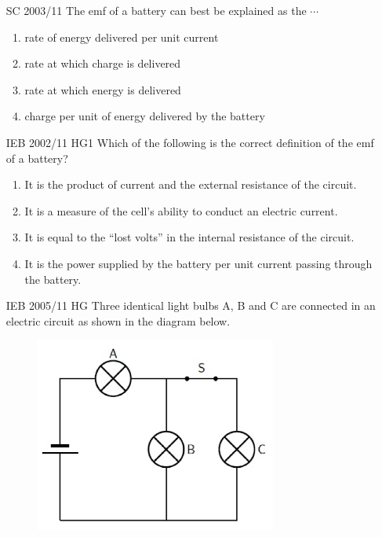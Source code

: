 \begin{enumerate}[noitemsep, label=\textbf{\arabic*}. ]
\label{m38776*uid90}\item [SC 2003/11] The emf of a battery can best be explained as the \begin{math}\cdots \end{math}\label{m38776*id68404}\begin{enumerate}[noitemsep, label=\textbf{\alph*}. ] 
            \label{m38776*uid91}\item rate of energy delivered per unit current
\label{m38776*uid92}\item rate at which charge is delivered
\label{m38776*uid93}\item rate at which energy is delivered
\label{m38776*uid94}\item charge per unit of energy delivered by the battery
\end{enumerate}
                  \label{m38776*uid95}\item [IEB 2002/11 HG1] Which of the following is the correct definition of the emf of a battery?
\label{m38776*id68470}\begin{enumerate}[noitemsep, label=\textbf{\alph*}. ] 
            \label{m38776*uid96}\item It is the product of current and the external resistance of the circuit.
\label{m38776*uid97}\item It is a measure of the cell's ability to conduct an electric current.
\label{m38776*uid98}\item It is equal to the ``lost volts'' in the internal resistance of the circuit.
\label{m38776*uid99}\item It is the power supplied by the battery per unit current passing through the battery.
\end{enumerate}
                  \label{m38776*uid100}\item [IEB 2005/11 HG] Three identical light bulbs A, B and C are connected in an electric circuit as shown in the diagram below.

    \setcounter{subfigure}{0}


	\begin{figure}[H] %
    \begin{center}
    \label{m38776*id68542!!!underscore!!!media}\label{m38776*id68542!!!underscore!!!printimage}\includegraphics[width=300px]{col11305.imgs/m38776_PG10C9_037.png} %
        

\end{center}
\end{figure}
\end{enumerate}
